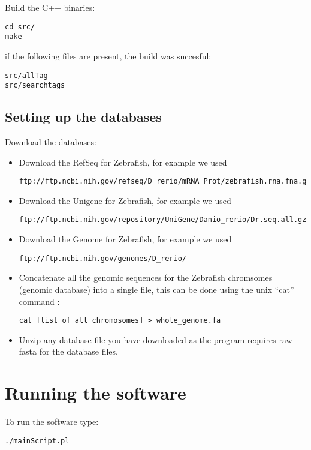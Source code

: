 \documentclass[a4paper,12pt]{article}
\begin{document}
Build the C++ binaries:
\small{
\begin{verbatim}
cd src/
make
\end{verbatim}
}

if the following files are present, the build was succesful: 
\small{
\begin{verbatim}
src/allTag
src/searchtags
\end{verbatim}
}

\subsection{Setting up the databases}
\label{sec:database}
Download the databases:

\begin{itemize}
\item Download the RefSeq for Zebrafish, for example we used 
\small{
\begin{verbatim}
ftp://ftp.ncbi.nih.gov/refseq/D_rerio/mRNA_Prot/zebrafish.rna.fna.gz
\end{verbatim}
}
\item Download the Unigene for Zebrafish, for example we used 
\small{
\begin{verbatim}
ftp://ftp.ncbi.nih.gov/repository/UniGene/Danio_rerio/Dr.seq.all.gz
\end{verbatim}
}

\item Download the Genome for Zebrafish, for example we used
\small{
\begin{verbatim}
ftp://ftp.ncbi.nih.gov/genomes/D_rerio/
\end{verbatim}
}
\item Concatenate all the genomic sequences for the Zebrafish chromsomes (genomic database) into a single file, this can be done using the unix ``cat'' command :
\small{
\begin{verbatim}
cat [list of all chromosomes] > whole_genome.fa
\end{verbatim}
}
\item Unzip any database file you have downloaded as the program requires raw fasta for the database files.
\end{itemize}


\section{Running the software}

To run the software type:
\small{
\begin{verbatim}
./mainScript.pl
\end{verbatim}
}
\end{document}
